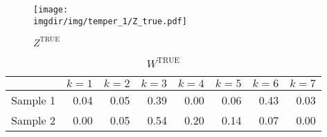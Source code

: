 \documentclass[10pt]{article} %
\def\true{\text{TRUE}}
\def\imgdir{../../results/test-sim-6-7-4/maxtemp2-ntempts20-degree2-N500}
\begin{document}
\begin{figure}[H]
  \begin{center}  %
    \texttt{[image: \\imgdir/img/temper\_1/Z\_true.pdf]}
  \end{center}
  \caption{$Z^\true$}
  \label{fig:Z-true}
\end{figure}

\begin{table}[ht]
  \centering
  \begin{tabular}{rrrrrrrr}
    \hline
    & $k=1$ & $k=2$ & $k=3$ & $k=4$ & $k=5$ & $k=6$ & $k=7$ \\
    \hline
    Sample 1 & 0.04 & 0.05 & 0.39 & 0.00 & 0.06 & 0.43 & 0.03 \\
    Sample 2 & 0.00 & 0.05 & 0.54 & 0.20 & 0.14 & 0.07 & 0.00 \\
    \hline
  \end{tabular}
  \caption{$W^\true$}
  \label{tab:W-true}
\end{table}
\end{document}
